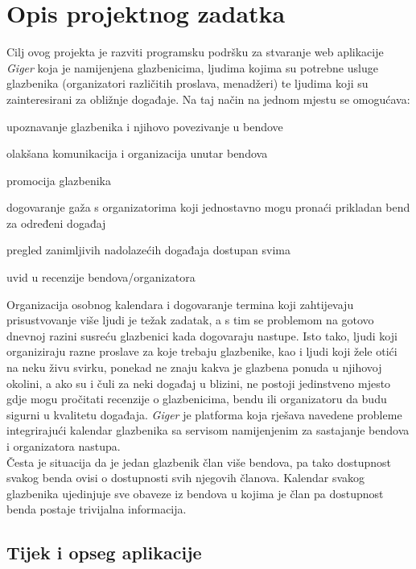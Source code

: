 \chapter{Opis projektnog zadatka}
			
		Cilj ovog projekta je razviti programsku podršku za stvaranje web aplikacije \textit{Giger} koja je namijenjena glazbenicima, ljudima kojima su potrebne usluge glazbenika (organizatori različitih proslava, menadžeri) te ljudima koji su zainteresirani za obližnje događaje. Na taj način na jednom mjestu se omogućava:
		
		\begin{packed_item}
			\item upoznavanje glazbenika i njihovo povezivanje u bendove
			\item olakšana komunikacija i organizacija unutar bendova
			\item promocija glazbenika
			\item dogovaranje gaža s organizatorima koji jednostavno mogu pronaći prikladan bend za određeni događaj
			\item pregled zanimljivih nadolazećih događaja dostupan svima
			\item uvid u recenzije bendova/organizatora
		\end{packed_item}
	

		Organizacija osobnog kalendara i dogovaranje termina koji zahtijevaju prisustvovanje više ljudi je težak zadatak, a s tim se problemom na gotovo dnevnoj razini susreću glazbenici kada dogovaraju nastupe. Isto tako, ljudi koji organiziraju razne proslave za koje trebaju glazbenike, kao i ljudi koji žele otići na neku živu svirku, ponekad ne znaju kakva je glazbena ponuda u njihovoj okolini, a ako su i čuli za neki događaj u blizini, ne postoji jedinstveno mjesto gdje mogu pročitati recenzije o glazbenicima, bendu ili organizatoru da budu sigurni u kvalitetu događaja.
		\textit{Giger} je platforma koja rješava navedene probleme integrirajući kalendar glazbenika sa servisom namijenjenim za sastajanje bendova i organizatora nastupa. 
		\\
		
		Česta je situacija da je jedan glazbenik član više bendova, pa tako dostupnost svakog benda ovisi o dostupnosti svih njegovih članova.  Kalendar svakog glazbenika ujedinjuje sve obaveze iz bendova u kojima je član pa dostupnost benda postaje trivijalna informacija. 
		
		
		
		\section{Tijek i opseg aplikacije}
		
